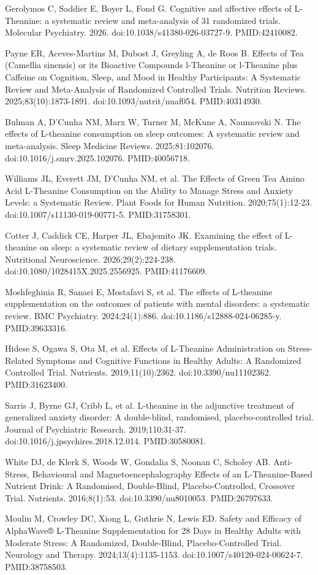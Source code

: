 \documentclass[11pt,oneside]{book}
\newcommand{\reff}[2]{\par\hangindent=7mm\hangafter=1\noindent[#1]\hspace{2mm}#2\par}
\begin{document}
\reff{32}{Gerolymos C, Saddier E, Boyer L, Fond G. Cognitive and affective effects of L-Theanine: a systematic review and meta-analysis of 31 randomized trials. Molecular Psychiatry. 2026. doi:10.1038/s41380-026-03727-9. PMID:42410082.}
\reff{33}{Payne ER, Aceves-Martins M, Dubost J, Greyling A, de Roos B. Effects of Tea (Camellia sinensis) or its Bioactive Compounds l-Theanine or l-Theanine plus Caffeine on Cognition, Sleep, and Mood in Healthy Participants: A Systematic Review and Meta-Analysis of Randomized Controlled Trials. Nutrition Reviews. 2025;83(10):1873-1891. doi:10.1093/nutrit/nuaf054. PMID:40314930.}
\reff{34}{Bulman A, D'Cunha NM, Marx W, Turner M, McKune A, Naumovski N. The effects of L-theanine consumption on sleep outcomes: A systematic review and meta-analysis. Sleep Medicine Reviews. 2025;81:102076. doi:10.1016/j.smrv.2025.102076. PMID:40056718.}
\reff{35}{Williams JL, Everett JM, D'Cunha NM, et al. The Effects of Green Tea Amino Acid L-Theanine Consumption on the Ability to Manage Stress and Anxiety Levels: a Systematic Review. Plant Foods for Human Nutrition. 2020;75(1):12-23. doi:10.1007/s11130-019-00771-5. PMID:31758301.}
\reff{36}{Cotter J, Caddick CE, Harper JL, Ebajemito JK. Examining the effect of L-theanine on sleep: a systematic review of dietary supplementation trials. Nutritional Neuroscience. 2026;29(2):224-238. doi:10.1080/1028415X.2025.2556925. PMID:41176609.}
\reff{37}{Moshfeghinia R, Sanaei E, Mostafavi S, et al. The effects of L-theanine supplementation on the outcomes of patients with mental disorders: a systematic review. BMC Psychiatry. 2024;24(1):886. doi:10.1186/s12888-024-06285-y. PMID:39633316.}
\reff{38}{Hidese S, Ogawa S, Ota M, et al. Effects of L-Theanine Administration on Stress-Related Symptoms and Cognitive Functions in Healthy Adults: A Randomized Controlled Trial. Nutrients. 2019;11(10):2362. doi:10.3390/nu11102362. PMID:31623400.}
\reff{39}{Sarris J, Byrne GJ, Cribb L, et al. L-theanine in the adjunctive treatment of generalized anxiety disorder: A double-blind, randomised, placebo-controlled trial. Journal of Psychiatric Research. 2019;110:31-37. doi:10.1016/j.jpsychires.2018.12.014. PMID:30580081.}
\reff{40}{White DJ, de Klerk S, Woods W, Gondalia S, Noonan C, Scholey AB. Anti-Stress, Behavioural and Magnetoencephalography Effects of an L-Theanine-Based Nutrient Drink: A Randomised, Double-Blind, Placebo-Controlled, Crossover Trial. Nutrients. 2016;8(1):53. doi:10.3390/nu8010053. PMID:26797633.}
\reff{41}{Moulin M, Crowley DC, Xiong L, Guthrie N, Lewis ED. Safety and Efficacy of AlphaWave® L-Theanine Supplementation for 28 Days in Healthy Adults with Moderate Stress: A Randomized, Double-Blind, Placebo-Controlled Trial. Neurology and Therapy. 2024;13(4):1135-1153. doi:10.1007/s40120-024-00624-7. PMID:38758503.}
\end{document}
